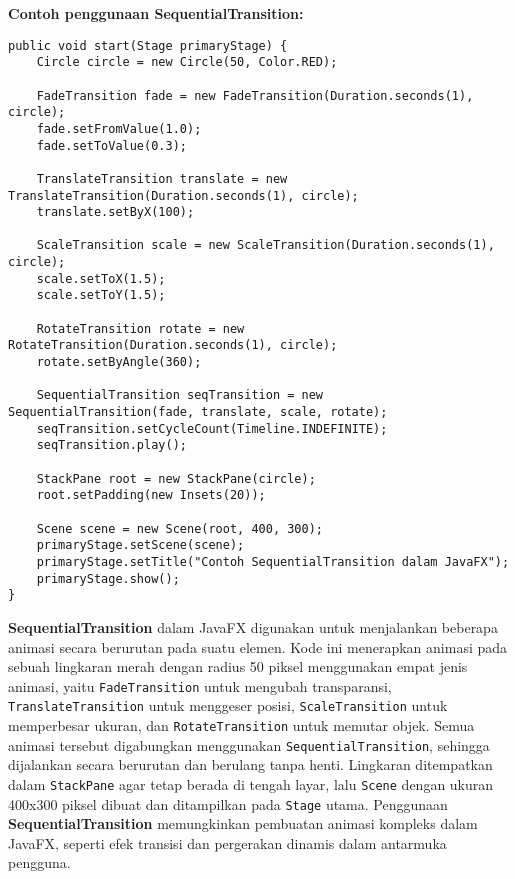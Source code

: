 \textbf{Contoh penggunaan SequentialTransition:}
\begin{lstlisting}[style=JavaStyle, caption=Menggabungkan beberapa animasi dalam JavaFX]
public void start(Stage primaryStage) {
	Circle circle = new Circle(50, Color.RED);
	
	FadeTransition fade = new FadeTransition(Duration.seconds(1), circle);
	fade.setFromValue(1.0);
	fade.setToValue(0.3);
	
	TranslateTransition translate = new TranslateTransition(Duration.seconds(1), circle);
	translate.setByX(100);
	
	ScaleTransition scale = new ScaleTransition(Duration.seconds(1), circle);
	scale.setToX(1.5);
	scale.setToY(1.5);
	
	RotateTransition rotate = new RotateTransition(Duration.seconds(1), circle);
	rotate.setByAngle(360);
	
	SequentialTransition seqTransition = new SequentialTransition(fade, translate, scale, rotate);
	seqTransition.setCycleCount(Timeline.INDEFINITE);
	seqTransition.play();
	
	StackPane root = new StackPane(circle);
	root.setPadding(new Insets(20));
	
	Scene scene = new Scene(root, 400, 300);
	primaryStage.setScene(scene);
	primaryStage.setTitle("Contoh SequentialTransition dalam JavaFX");
	primaryStage.show();
}
\end{lstlisting}

\textbf{SequentialTransition} dalam JavaFX digunakan untuk menjalankan beberapa animasi secara berurutan pada suatu elemen. Kode ini menerapkan animasi pada sebuah lingkaran merah dengan radius 50 piksel menggunakan empat jenis animasi, yaitu \texttt{FadeTransition} untuk mengubah transparansi, \texttt{TranslateTransition} untuk menggeser posisi, \texttt{ScaleTransition} untuk memperbesar ukuran, dan \texttt{RotateTransition} untuk memutar objek. Semua animasi tersebut digabungkan menggunakan \texttt{SequentialTransition}, sehingga dijalankan secara berurutan dan berulang tanpa henti. Lingkaran ditempatkan dalam \texttt{StackPane} agar tetap berada di tengah layar, lalu \texttt{Scene} dengan ukuran 400x300 piksel dibuat dan ditampilkan pada \texttt{Stage} utama. Penggunaan \textbf{SequentialTransition} memungkinkan pembuatan animasi kompleks dalam JavaFX, seperti efek transisi dan pergerakan dinamis dalam antarmuka pengguna.





